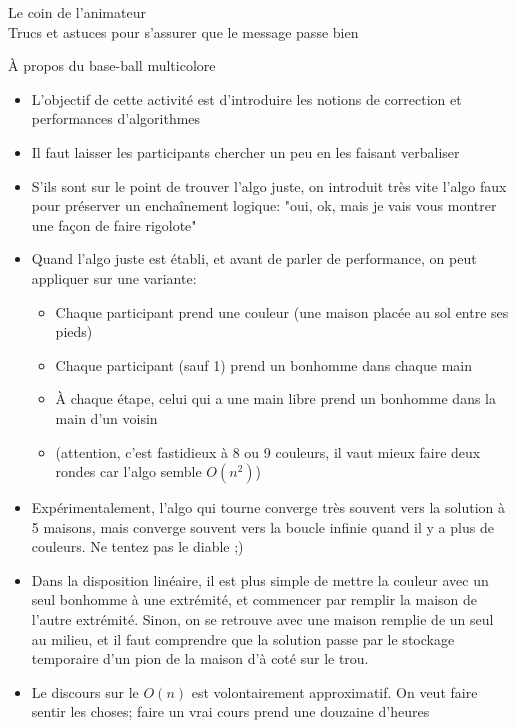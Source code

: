 \begin{frame}{Le coin de l'animateur\\[-5pt]
  {\large Trucs et astuces pour s'assurer que le message passe bien}}
  \begin{block}{À propos du base-ball multicolore}
    \begin{itemize}
    \item L'objectif de cette activité est d'introduire les notions de
      correction et performances d'algorithmes
    \item Il faut laisser les participants chercher un peu en les faisant verbaliser
    \item S'ils sont sur le point de trouver l'algo juste, on introduit très
      vite l'algo faux pour préserver un enchaînement logique: "oui, ok, mais
      je vais vous montrer une façon de faire rigolote"
    \item Quand l'algo juste est établi, et avant de parler de performance, on
      peut appliquer sur une variante:\vspace{-\baselineskip}
      \begin{itemize}
      \item Chaque participant prend une couleur (une maison placée au sol entre ses pieds)
      \item Chaque participant (sauf 1) prend un bonhomme dans chaque main
      \item À chaque étape, celui qui a une main libre prend un bonhomme dans la main d'un voisin
      \item (attention, c'est fastidieux à 8 ou 9 couleurs, il vaut mieux faire
        deux rondes car l'algo semble $O(n^2)$)
      \end{itemize}
    \item Expérimentalement, l'algo qui tourne converge très souvent vers la
      solution à 5 maisons, mais converge souvent vers la boucle infinie quand
      il y a plus de couleurs. Ne tentez pas le diable ;)
    \item Dans la disposition linéaire, il est plus simple de mettre la couleur
      avec un seul bonhomme à une extrémité, et commencer par remplir la maison
      de l'autre extrémité. Sinon, on se retrouve avec une maison remplie de un
      seul au milieu, et il faut comprendre que la solution passe par le
      stockage temporaire d'un pion de la maison d'à coté sur le trou.
    \item Le discours sur le $O(n)$ est volontairement approximatif. On veut
      faire sentir les choses; faire un vrai cours prend une douzaine d'heures

\end{itemize}
\end{block}
\end{frame}
